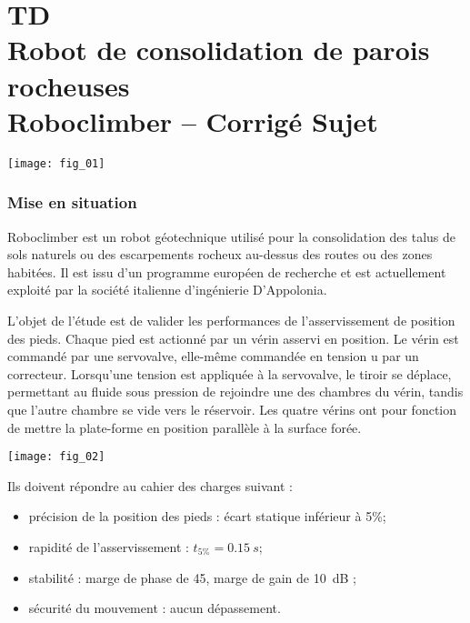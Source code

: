 \chapter*{TD  \\ 
Robot de consolidation de parois rocheuses \\  Roboclimber -- \ifprof Corrigé \else Sujet \fi}


\iflivret {} \else
\ifprof  {} \else \fi
\fi
\setcounter{question}{0}

\begin{marginfigure}
\centering
\texttt{[image: fig\_01]}
\end{marginfigure}


\subsection*{Mise en situation}
Roboclimber est un robot géotechnique utilisé pour la consolidation des talus de sols naturels
ou des escarpements rocheux au-dessus des routes ou des zones habitées. Il est
issu d’un programme européen de recherche et est actuellement exploité par la société italienne
d’ingénierie D’Appolonia.



L’objet de l’étude est de valider les performances de l’asservissement de position des pieds.
Chaque pied est actionné par un vérin asservi en position. Le vérin est commandé par une
servovalve, elle-même commandée en tension u par un correcteur. Lorsqu’une
tension est appliquée à la servovalve, le tiroir se déplace, permettant au fluide sous pression de
rejoindre une des chambres du vérin, tandis que l’autre chambre se vide vers le réservoir.
Les quatre vérins ont pour fonction de mettre la plate-forme en position parallèle à la surface
forée. 



\begin{marginfigure}
\texttt{[image: fig\_02]}
\end{marginfigure}
Ils doivent répondre au cahier des charges suivant :
\begin{itemize}
\item précision de la position des pieds : écart statique inférieur à 5\%;
\item rapidité de l’asservissement : $t_{5\%} = \SI{0,15}{s}$;
\item stabilité : marge de phase de 45\degres, marge de gain de \SI{10}{dB} ;
\item sécurité du mouvement : aucun dépassement.
\end{itemize}

